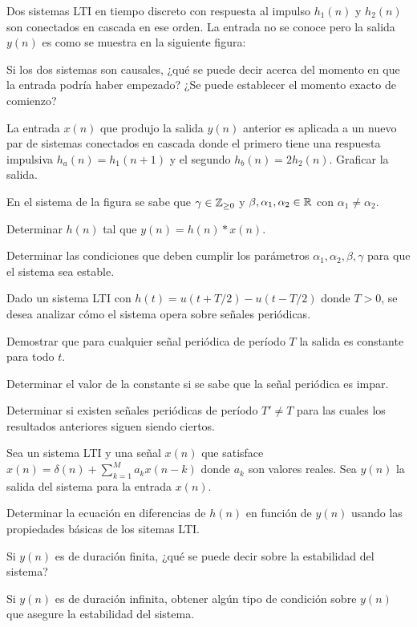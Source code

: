 \begin{ejercicio}
    Dos sistemas LTI en tiempo discreto con respuesta al impulso $h_1(n)$ y $h_2(n)$ son conectados en cascada en ese orden. La entrada no se conoce pero la salida $y(n)$ es como se muestra en la siguiente figura:
    \begin{center}
        
    \end{center}
    
    \inciso Si los dos sistemas son causales, ¿qué se puede decir acerca del momento en que la entrada podría haber empezado? ¿Se puede establecer el momento exacto de comienzo?
    
    \inciso La entrada $x(n)$ que produjo la salida $y(n)$ anterior es aplicada a un nuevo par de sistemas conectados en cascada donde el primero tiene una respuesta impulsiva $h_a(n) = h_1(n + 1)$ y el segundo $h_b(n) = 2h_2(n)$. Graficar la salida.
\end{ejercicio}
    
\begin{ejercicio}
    En el sistema de la figura se sabe que $\gamma \in \mathbb{Z}_{\geq 0}$ y $\beta, \alpha_1, \alpha_2 \in \mathbb{R}$ con $\alpha_1 \neq \alpha_2$.
    \begin{center}
        
    \end{center}

    \inciso Determinar $h(n)$ tal que $y(n) = h(n) * x(n)$.

    \inciso Determinar las condiciones que deben cumplir los parámetros $\alpha_1, \alpha_2, \beta, \gamma$ para que el sistema sea estable.
\end{ejercicio}

\begin{ejercicio}
    Dado un sistema LTI con $h(t) = u(t + T/2) - u(t - T/2)$ donde $T>0$, se desea analizar cómo el sistema opera sobre señales periódicas.
    
    \inciso Demostrar que para cualquier señal periódica de período $T$ la salida es constante para todo $t$.

    \inciso Determinar el valor de la constante si se sabe que la señal periódica es impar.

    \inciso Determinar si existen señales periódicas de período $T'\neq T$ para las cuales los resultados anteriores siguen siendo ciertos.
\end{ejercicio}

\begin{ejercicio}
    Sea un sistema LTI y una señal $x(n)$ que satisface $x(n)=\delta(n) + \sum_{k=1}^M a_k x(n-k)$ donde $a_k$ son valores reales. Sea $y(n)$ la salida del sistema para la entrada $x(n)$.

    \inciso Determinar la ecuación en diferencias de $h(n)$ en función de $y(n)$ usando las propiedades básicas de los sitemas LTI.
    
    \inciso Si $y(n)$ es de duración finita, ¿qué se puede decir sobre la estabilidad del sistema?

    \inciso Si $y(n)$ es de duración infinita, obtener algún tipo de condición sobre $y(n)$ que asegure la estabilidad del sistema.
\end{ejercicio}

